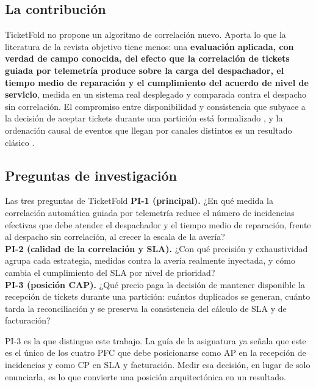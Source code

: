 \documentclass[11pt,a4paper]{article}
\begin{document}
\subsection{La contribución}

TicketFold no propone un algoritmo de correlación nuevo. Aporta lo que la literatura de la revista objetivo tiene menos: una \textbf{evaluación aplicada, con verdad de campo conocida, del efecto que la correlación de tickets guiada por telemetría produce sobre la carga del despachador, el tiempo medio de reparación y el cumplimiento del acuerdo de nivel de servicio}, medida en un sistema real desplegado y comparada contra el despacho sin correlación. El compromiso entre disponibilidad y consistencia que subyace a la decisión de aceptar tickets durante una partición está formalizado \cite{gilbert2002brewer}, y la ordenación causal de eventos que llegan por canales distintos es un resultado clásico \cite{lamport1978time}.

\subsection{Preguntas de investigación}

\begin{aviso}{Las tres preguntas de TicketFold}
	\textbf{PI-1 (principal).} ¿En qué medida la correlación automática guiada por telemetría reduce el número de incidencias efectivas que debe atender el despachador y el tiempo medio de reparación, frente al despacho sin correlación, al crecer la escala de la avería?\\[6pt]
	\textbf{PI-2 (calidad de la correlación y SLA).} ¿Con qué precisión y exhaustividad agrupa cada estrategia, medidas contra la avería realmente inyectada, y cómo cambia el cumplimiento del SLA por nivel de prioridad?\\[6pt]
	\textbf{PI-3 (posición CAP).} ¿Qué precio paga la decisión de mantener disponible la recepción de tickets durante una partición: cuántos duplicados se generan, cuánto tarda la reconciliación y se preserva la consistencia del cálculo de SLA y de facturación?
\end{aviso}

PI-3 es la que distingue este trabajo. La guía de la asignatura ya señala que este es el único de los cuatro PFC que debe posicionarse como AP en la recepción de incidencias y como CP en SLA y facturación. Medir esa decisión, en lugar de solo enunciarla, es lo que convierte una posición arquitectónica en un resultado.
\end{document}
